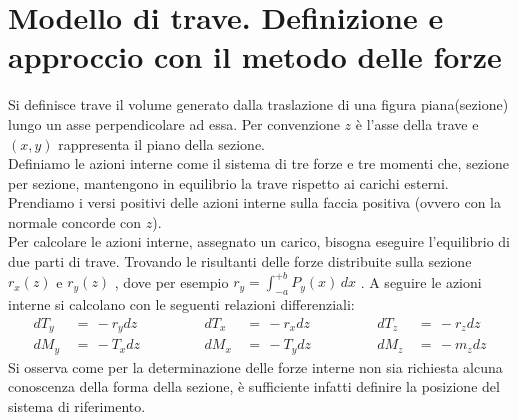 \section{Modello di trave. Definizione e approccio con il metodo delle forze}

Si definisce trave il volume generato dalla traslazione di una figura piana(sezione) lungo un asse perpendicolare ad essa. Per convenzione $z$ è l'asse della trave e $(x,y)$ rappresenta il piano della sezione.\\
Definiamo le azioni interne come il sistema di tre forze e tre momenti che, sezione per sezione, mantengono in equilibrio la trave rispetto ai carichi esterni. Prendiamo i versi positivi delle azioni interne sulla faccia positiva (ovvero con la normale concorde con $z$).\\
Per calcolare le azioni interne, assegnato un carico, bisogna eseguire l'equilibrio di due parti di trave. Trovando le risultanti delle forze distribuite sulla sezione $r_x(z)$ e $r_y(z)$ , dove per esempio $r_y = \int_{-a}^{+b}P_y(x)\,dx$ . A seguire le azioni interne si calcolano con le seguenti relazioni differenziali:
\begin{align*}
    dT_y \, &=\, -r_ydz \quad \quad \quad\quad &dT_x \, &=\, -r_xdz \quad \quad \quad\quad &dT_z \, &=\, -r_zdz \\
    dM_y \, &=\, -T_xdz      &dM_x \, &=\, -T_ydz       &dM_z \, &=\, -m_zdz 
\end{align*}
Si osserva come per la determinazione delle forze interne non sia richiesta alcuna conoscenza della forma della sezione, è sufficiente infatti definire la posizione del sistema di riferimento.\\

